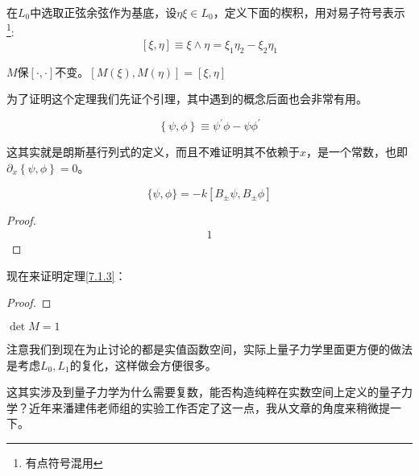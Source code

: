 在$L_0$中选取正弦余弦作为基底，设$\eta\xi\in L_0$，定义下面的楔积，用对易子符号表示\footnote{有点符号混用}:
\begin{equation}
	\left[\xi,\eta\right]\equiv \xi\wedge \eta =\xi_1\eta_2-\xi_2\eta_1
\end{equation}
\begin{theorem}\label{7.1.3}
	$M$保$\left[\cdot,\cdot\right]$不变。$\left[M(\xi),M(\eta)\right]=\left[\xi,\eta\right]$
\end{theorem}
为了证明这个定理我们先证个引理，其中遇到的概念后面也会非常有用。
\begin{definition}[斜积]
	\begin{equation}
		\left\{\psi,\phi\right\}\equiv\psi^\prime\phi-\psi\phi^\prime
	\end{equation}
\end{definition}
这其实就是朗斯基行列式的定义，而且不难证明其不依赖于$x$，是一个常数，也即$\partial_x\left\{\psi,\phi\right\}=0$。
\begin{lemma}
	\begin{equation}
		\{\psi,\phi\}=-k\left[B_\pm\psi,B_\pm\phi\right]
	\end{equation}
\end{lemma}
\begin{proof}
	\begin{equation}
		\begin{aligned}
			1
		\end{aligned}
	\end{equation}
\end{proof}
现在来证明定理\ref{7.1.3}：
\begin{proof}
	
\end{proof}
\begin{corollary}
	$\det M=1$
\end{corollary}

注意我们到现在为止讨论的都是实值函数空间，实际上量子力学里面更方便的做法是考虑$L_0,L_1$的复化，这样做会方便很多。
\begin{definition}[复化]
	
\end{definition}
\begin{remark}
	这其实涉及到量子力学为什么需要复数，能否构造纯粹在实数空间上定义的量子力学？近年来潘建伟老师组的实验工作否定了这一点\cite{Renou:2021dvp,Chen:2021ril}，我从文章\cite{karam_why_2020}的角度来稍微提一下。
\end{remark}